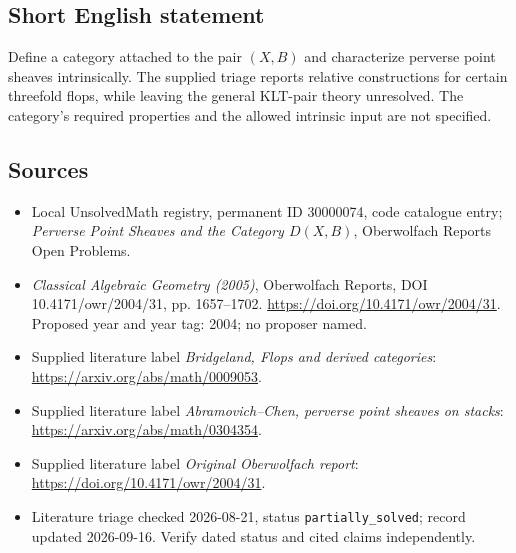\documentclass[11pt]{article}
\begin{document}
\subsection{Short English statement}
Define a category attached to the pair \((X,B)\) and characterize perverse point sheaves intrinsically. The supplied triage reports relative constructions for certain threefold flops, while leaving the general KLT-pair theory unresolved. The category's required properties and the allowed intrinsic input are not specified.
\subsection{Sources}
\begin{itemize}\item Local UnsolvedMath registry, permanent ID 30000074, code catalogue entry; \emph{Perverse Point Sheaves and the Category \(D(X,B)\)}, Oberwolfach Reports Open Problems.\item \emph{Classical Algebraic Geometry (2005)}, Oberwolfach Reports, DOI 10.4171/owr/2004/31, pp. 1657--1702. \url{https://doi.org/10.4171/owr/2004/31}. Proposed year and year tag: 2004; no proposer named.\item Supplied literature label \emph{Bridgeland, Flops and derived categories}: \url{https://arxiv.org/abs/math/0009053}.\item Supplied literature label \emph{Abramovich--Chen, perverse point sheaves on stacks}: \url{https://arxiv.org/abs/math/0304354}.\item Supplied literature label \emph{Original Oberwolfach report}: \url{https://doi.org/10.4171/owr/2004/31}.\item Literature triage checked 2026-08-21, status \texttt{partially\_solved}; record updated 2026-09-16. Verify dated status and cited claims independently.\end{itemize}
\end{document}
